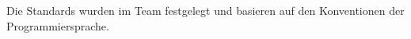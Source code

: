 \documentclass[../../Pflichtenheft.tex]{subfiles}
\begin{document}
    Die Standards wurden im Team festgelegt und basieren auf den Konventionen der Programmiersprache.
\end{document}
